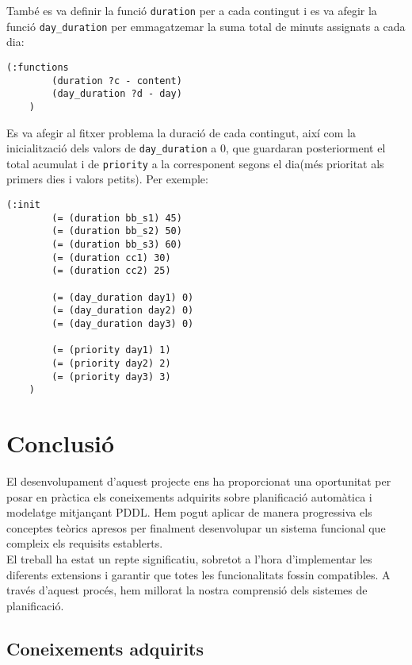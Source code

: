 \documentclass[a4paper]{article}
\begin{document}
	També es va definir la funció \texttt{duration} per a cada contingut i es va afegir la funció \texttt{day\_duration} per emmagatzemar la suma total de minuts assignats a cada dia:
	\begin{lstlisting}[language=PDDL, caption={Funcions per l'extensió 4}, label={lst:funcionsExtensio4}]
	(:functions
		(duration ?c - content)
		(day_duration ?d - day)
	)
	\end{lstlisting}
	
	Es va afegir al fitxer problema la duració de cada contingut, així com la inicialització dels valors de \texttt{day\_duration} a 0, que guardaran posteriorment el total acumulat i de \texttt{priority} a la corresponent segons el dia(més prioritat als primers dies i valors petits). Per exemple:
	\begin{lstlisting}[language=PDDL, caption={Novetats en la inicialització per l'extensió 4}, label={lst:iniExtensio4}]
	(:init
		(= (duration bb_s1) 45)
		(= (duration bb_s2) 50)
		(= (duration bb_s3) 60)
		(= (duration cc1) 30)
		(= (duration cc2) 25)
		
		(= (day_duration day1) 0)
		(= (day_duration day2) 0)
		(= (day_duration day3) 0)

		(= (priority day1) 1)
		(= (priority day2) 2)
		(= (priority day3) 3)
	)
	\end{lstlisting}

	
	\newpage
	\section{Conclusió}
	
	El desenvolupament d'aquest projecte ens ha proporcionat una oportunitat per posar en pràctica els coneixements adquirits sobre planificació automàtica i modelatge mitjançant PDDL. Hem pogut aplicar de manera progressiva els conceptes teòrics apresos per finalment desenvolupar un sistema funcional que compleix els requisits establerts.\\ 
	
	El treball ha estat un repte significatiu, sobretot a l'hora d'implementar les diferents extensions i garantir que totes les funcionalitats fossin compatibles. A través d'aquest procés, hem millorat la nostra comprensió dels sistemes de planificació.
	
	
	
	\subsection{Coneixements adquirits}
	
\end{document}

